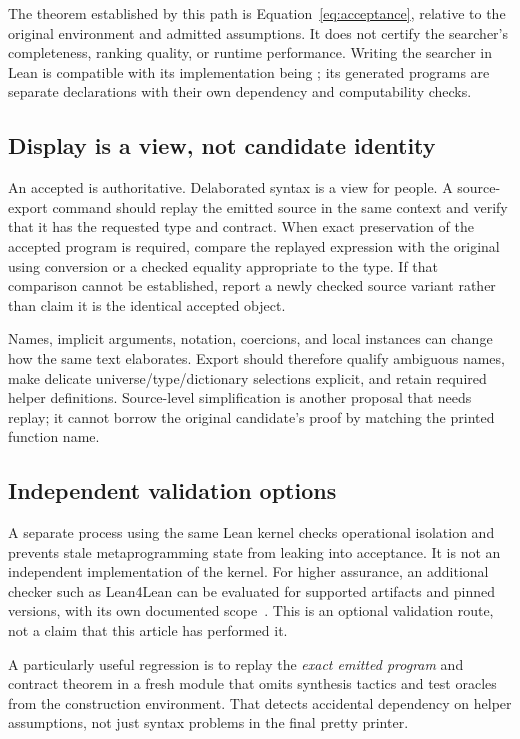 The theorem established by this path is Equation~\eqref{eq:acceptance}, relative
to the original environment and admitted assumptions. It does not certify the
searcher's completeness, ranking quality, or runtime performance. Writing the
searcher in Lean is compatible with its implementation being ;
its generated programs are separate declarations with their own dependency
and computability checks.

\subsection{Display is a view, not candidate identity}

An accepted \Expr{} is authoritative. Delaborated syntax is a view for people.
A source-export command should replay the emitted source in the same context
and verify that it has the requested type and contract. When exact preservation
of the accepted program is required, compare the replayed expression with the
original using conversion or a checked equality appropriate to the type.
If that comparison cannot be established, report a newly checked source
variant rather than claim it is the identical accepted object.

Names, implicit arguments, notation, coercions, and local instances can change
how the same text elaborates. Export should therefore qualify ambiguous names,
make delicate universe/type/dictionary selections explicit, and retain
required helper definitions. Source-level simplification is another proposal
that needs replay; it cannot borrow the original candidate's proof by matching
the printed function name.

\subsection{Independent validation options}

A separate process using the same Lean kernel checks operational isolation and
prevents stale metaprogramming state from leaking into acceptance. It is not an
independent implementation of the kernel. For higher assurance, an additional
checker such as Lean4Lean can be evaluated for supported artifacts and pinned
versions, with its own documented scope~\cite{lean4lean}. This is an optional
validation route, not a claim that this article has performed it.

A particularly useful regression is to replay the \emph{exact emitted program}
and contract theorem in a fresh module that omits synthesis tactics and test
oracles from the construction environment. That detects accidental dependency
on helper assumptions, not just syntax problems in the final pretty printer.


